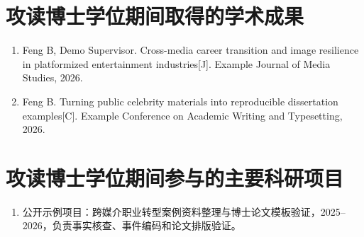 \section*{攻读博士学位期间取得的学术成果}

\begin{enumerate}
  \item Feng B, Demo Supervisor. Cross-media career transition and image resilience in platformized entertainment industries[J]. Example Journal of Media Studies, 2026.
  \item Feng B. Turning public celebrity materials into reproducible dissertation examples[C]. Example Conference on Academic Writing and Typesetting, 2026.
\end{enumerate}

\section*{攻读博士学位期间参与的主要科研项目}

\begin{enumerate}
  \item 公开示例项目：跨媒介职业转型案例资料整理与博士论文模板验证，2025--2026，负责事实核查、事件编码和论文排版验证。
\end{enumerate}
